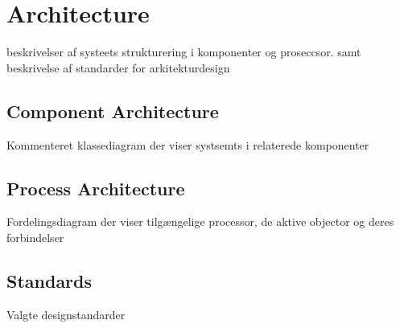 \chapter{Architecture}
beskrivelser af systeets strukturering i komponenter og proseccsor. samt beskrivelse af standarder for arkitekturdesign 

\section{Component Architecture}
Kommenteret klassediagram der viser systsemts i relaterede komponenter

\section{Process Architecture}
Fordelingsdiagram der viser tilgængelige processor, de aktive objector og deres forbindelser 

\section{Standards}
Valgte designstandarder